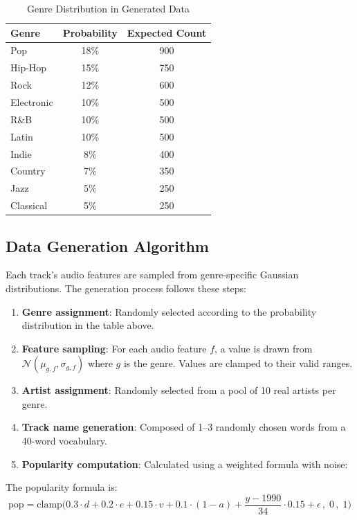 \documentclass[12pt,a4paper]{article}
\begin{document}
\begin{table}[H]
\centering
\caption{Genre Distribution in Generated Data}
\begin{tabular}{@{}lcc@{}}
\toprule
\textbf{Genre} & \textbf{Probability} & \textbf{Expected Count} \\
\midrule
Pop         & 18\% & 900 \\
Hip-Hop     & 15\% & 750 \\
Rock        & 12\% & 600 \\
Electronic  & 10\% & 500 \\
R\&B        & 10\% & 500 \\
Latin       & 10\% & 500 \\
Indie       &  8\% & 400 \\
Country     &  7\% & 350 \\
Jazz        &  5\% & 250 \\
Classical   &  5\% & 250 \\
\bottomrule
\end{tabular}
\end{table}

\subsection{Data Generation Algorithm}

Each track's audio features are sampled from genre-specific Gaussian distributions. The generation process follows these steps:

\begin{enumerate}[noitemsep]
    \item \textbf{Genre assignment}: Randomly selected according to the probability distribution in the table above.
    \item \textbf{Feature sampling}: For each audio feature $f$, a value is drawn from $\mathcal{N}(\mu_{g,f}, \sigma_{g,f})$ where $g$ is the genre. Values are clamped to their valid ranges.
    \item \textbf{Artist assignment}: Randomly selected from a pool of 10 real artists per genre.
    \item \textbf{Track name generation}: Composed of 1--3 randomly chosen words from a 40-word vocabulary.
    \item \textbf{Popularity computation}: Calculated using a weighted formula with noise:
\end{enumerate}

The popularity formula is:
\[
    \text{pop} = \text{clamp}\Big(
        0.3 \cdot d + 0.2 \cdot e + 0.15 \cdot v + 0.1 \cdot (1 - a)
        + \frac{y - 1990}{34} \cdot 0.15
        + \epsilon
    \,,\; 0 \,,\; 1\Big)
\]
\end{document}
